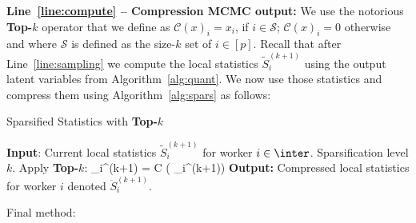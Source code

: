 \documentclass[11pt]{article}
\theoremstyle{t}
\begin{document}
\noindent \textbf{Line~\ref{line:compute} -- Compression MCMC output:}
We use the notorious \textbf{Top-$k$} operator that we define as $\mathcal C(x)_i=x_i$, if $i\in \mathcal S$; $\mathcal C(x)_i=0$ otherwise and where $\mathcal S$ is defined as the size-$k$ set of $i\in[p]$.
Recall that after Line~\ref{line:sampling} we compute the local statistics $\tilde{S}_{i}^{(k+1)}$ using the output latent variables from Algorithm~\ref{alg:quant}.
We now use those statistics and compress them using Algorithm~\ref{alg:spars} as follows:

\begin{algorithm}[H]
\caption{Sparsified Statistics with \textbf{Top-$k$}} \label{alg:spars}
\begin{algorithmic}[1]
\STATE \textbf{Input}: Current local statistics $\tilde{S}_{i}^{(k+1)}$ for worker $i \in \inter$. Sparsification level $k$.
\STATE Apply \textbf{Top-$k$}:
\beq\label{eq:topkstats}
_{i}^{(k+1)} = \mathcal C \left( _{i}^{(k+1)}\right)
\eeq
\STATE \textbf{Output:} Compressed local statistics for worker $i$ denoted $\ddot{S}_{i}^{(k+1)}$.
\end{algorithmic}
\end{algorithm}


Final method:
\end{document}
